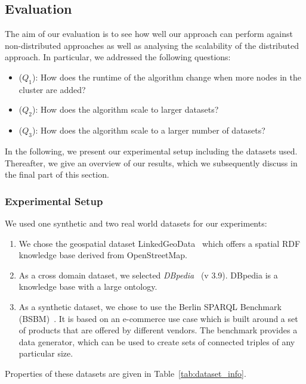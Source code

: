 \subsection{Evaluation}
\label{sec:evaluation}
The aim of our evaluation is to see how well our approach can perform against non-distributed approaches as well as analysing the scalability of the distributed approach. 
In particular, we addressed the following questions:   
\begin{itemize}
    \item ($Q_1$): How does the runtime of the algorithm change when more nodes in the cluster are added?
    \item ($Q_2$): How does the algorithm scale to larger datasets?
    \item ($Q_3$): How does the algorithm scale to a larger number of datasets?
\end{itemize}

In the following, we present our experimental setup including the datasets used. Thereafter, we give an overview of our results, which we subsequently discuss in the final part of this section.

\subsubsection{Experimental Setup}

We used one synthetic and two real world datasets for our experiments:
 \begin{enumerate}
 
 \item We chose the geospatial dataset LinkedGeoData~\cite{SLHA11} which offers a spatial RDF knowledge base derived from OpenStreetMap.
 
 \item As a cross domain dataset, we selected \emph{DBpedia}~\cite{dbpedia-swj} (v 3.9). DBpedia is a knowledge base with a large ontology.
 
 \item As a synthetic dataset, we chose to use the Berlin SPARQL Benchmark (BSBM)~\cite{Bizer2009TheBS}.
It is based on an e-commerce use case which is built around a set of products that are offered by different vendors.
The benchmark provides a data generator, which can be used to create sets of connected triples of any particular size.
\end{enumerate}

Properties of these datasets are given in Table~\ref{tab:dataset_info}.

